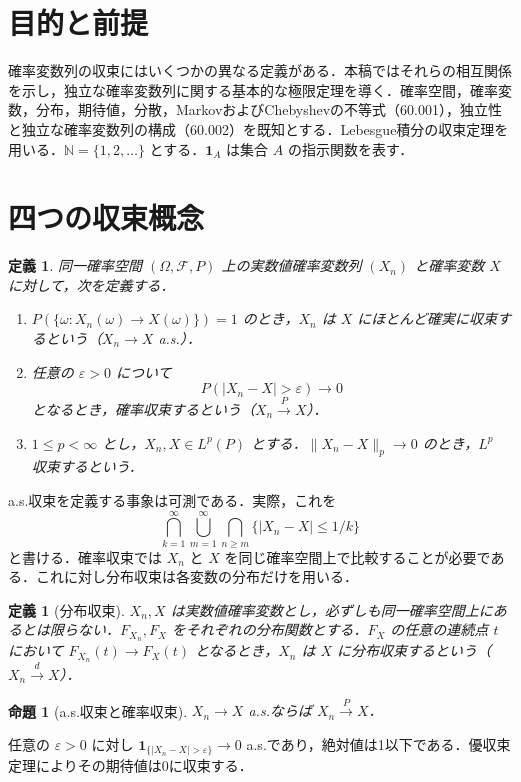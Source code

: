 \documentclass[a5paper,10pt,onecolumn]{jsarticle}
\makeatletter
\theoremstyle{mathnotetheorem}
\newtheorem{definition}[theorem]{定義}
\newtheorem{proposition}[theorem]{命題}
\renewcommand{\proofname}{証明}
\renewenvironment{proof}[1][\proofname]{%
  \par\pushQED{\qed}\normalfont\topsep4\p@\@plus2\p@\relax
  \trivlist\item[\hskip\labelsep\bfseries #1]\ignorespaces
}{\popQED\endtrivlist\@endpefalse}
\newcommand{\norm}[1]{\lVert #1\rVert}
\newcommand{\N}{\mathbb{N}}
\newcommand{\F}{\mathcal F}
\newcommand{\1}{\mathbf{1}}
\makeatother
\begin{document}
\section{目的と前提}
確率変数列の収束にはいくつかの異なる定義がある．本稿ではそれらの相互関係を示し，独立な確率変数列に関する基本的な極限定理を導く．確率空間，確率変数，分布，期待値，分散，MarkovおよびChebyshevの不等式（60.001），独立性と独立な確率変数列の構成（60.002）を既知とする．Lebesgue積分の収束定理を用いる．$\N=\{1,2,\ldots\}$ とする．$\1_A$ は集合 $A$ の指示関数を表す．

\section{四つの収束概念}
\begin{definition}
同一確率空間 $(\Omega,\F,P)$ 上の実数値確率変数列 $(X_n)$ と確率変数 $X$ に対して，次を定義する．
\begin{enumerate}
\item $P(\{\omega:X_n(\omega)\to X(\omega)\})=1$ のとき，$X_n$ は $X$ にほとんど確実に収束するという（$X_n\to X$ a.s.）．
\item 任意の $\varepsilon>0$ について
\[
 P(|X_n-X|>\varepsilon)\longrightarrow0
\]
となるとき，確率収束するという（$X_n\xrightarrow{P}X$）．
\item $1\le p<\infty$ とし，$X_n,X\in L^p(P)$ とする．$\norm{X_n-X}_p\to0$ のとき，$L^p$ 収束するという．
\end{enumerate}
\end{definition}
a.s.収束を定義する事象は可測である．実際，これを
\[
 \bigcap_{k=1}^\infty\bigcup_{m=1}^\infty
 \bigcap_{n\ge m}\{|X_n-X|\le 1/k\}
\]
と書ける．確率収束では $X_n$ と $X$ を同じ確率空間上で比較することが必要である．これに対し分布収束は各変数の分布だけを用いる．
\begin{definition}[分布収束]\label{weakdef}
$X_n,X$ は実数値確率変数とし，必ずしも同一確率空間上にあるとは限らない．$F_{X_n},F_X$ をそれぞれの分布関数とする．$F_X$ の任意の連続点 $t$ において $F_{X_n}(t)\to F_X(t)$ となるとき，$X_n$ は $X$ に分布収束するという（$X_n\xrightarrow{d}X$）．
\end{definition}
\begin{proposition}[a.s.収束と確率収束]\label{asprob}
$X_n\to X$ a.s.ならば $X_n\xrightarrow{P}X$．
\end{proposition}
\begin{proof}
任意の $\varepsilon>0$ に対し $\1_{\{|X_n-X|>\varepsilon\}}\to0$ a.s.であり，絶対値は1以下である．優収束定理によりその期待値は0に収束する．
\end{proof}
\end{document}

